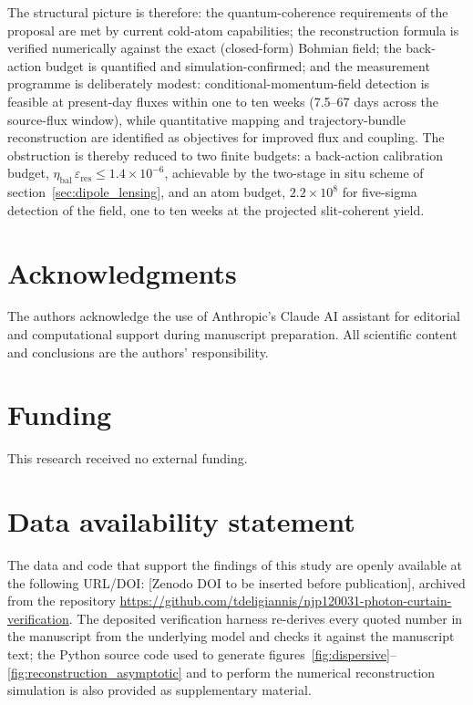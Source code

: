 \documentclass[11pt,a4paper]{article}
\begin{document}
The structural picture is therefore: the quantum-coherence requirements of the proposal are met by current cold-atom capabilities; the reconstruction formula is verified numerically against the exact (closed-form) Bohmian field; the back-action budget is quantified and simulation-confirmed; and the measurement programme is deliberately modest: conditional-momentum-field detection is feasible at present-day fluxes within one to ten weeks (7.5--67 days across the source-flux window), while quantitative mapping and trajectory-bundle reconstruction are identified as objectives for improved flux and coupling. The obstruction is thereby reduced to two finite budgets: a back-action calibration budget, $\eta_\text{bal}\,\varepsilon_\text{res} \leq 1.4\times 10^{-6}$, achievable by the two-stage in situ scheme of section~\ref{sec:dipole_lensing}, and an atom budget, $2.2\times 10^8$ for five-sigma detection of the field, one to ten weeks at the projected slit-coherent yield.

\section*{Acknowledgments}
The authors acknowledge the use of Anthropic's Claude AI assistant for editorial and computational support during manuscript preparation. All scientific content and conclusions are the authors' responsibility.

\section*{Funding}
This research received no external funding.

\section*{Data availability statement}
The data and code that support the findings of this study are openly available at the following URL/DOI: [Zenodo DOI to be inserted before publication], archived from the repository \url{https://github.com/tdeligiannis/njp120031-photon-curtain-verification}. The deposited verification harness re-derives every quoted number in the manuscript from the underlying model and checks it against the manuscript text; the Python source code used to generate figures~\ref{fig:dispersive}--\ref{fig:reconstruction_asymptotic} and to perform the numerical reconstruction simulation is also provided as supplementary material.

\appendix
\end{document}
